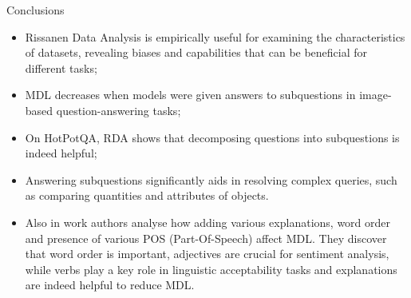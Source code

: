 \documentclass[10pt]{beamer}
\begin{document}
\begin{frame}{Conclusions}
    \begin{itemize}
        \item Rissanen Data Analysis is empirically useful for examining the characteristics of datasets, revealing biases and capabilities that can be beneficial for different tasks;
        \item MDL decreases when models were given answers to subquestions in image-based question-answering tasks;
        \item On HotPotQA, RDA shows that decomposing questions into subquestions is indeed helpful;
        \item Answering subquestions significantly aids in resolving complex queries, such as comparing quantities and attributes of objects.
        \item Also in work authors analyse how adding various explanations, word order and presence of various POS (Part-Of-Speech) affect MDL. They discover that word order is important, adjectives are crucial for sentiment analysis, while verbs play a key role in linguistic acceptability tasks and explanations are indeed helpful to reduce MDL.
    \end{itemize}
\end{frame}
\end{document}

